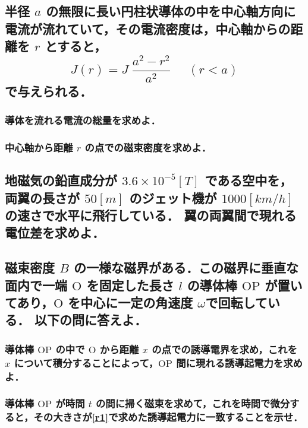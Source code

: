 \documentclass[a4paper, 12pt]{bxjsarticle}
\begin{document}
\newpage
\begin{samepage}
\subsection{半径 \(a\) の無限に長い円柱状導体の中を中心軸方向に電流が流れていて，その電流密度は，中心軸からの距離を \(r\) とすると，\[
    J(r) = J\;\frac{a^2-r^2}{a^2}\;\;\;\;\;(r < a)\]で与えられる．}
\subsubsection{導体を流れる電流の総量を求めよ．}
\vspace{10em}
\subsubsection{中心軸から距離 \(r\) の点での磁束密度を求めよ．}
\vspace{10em}
\subsection{地磁気の鉛直成分が \(3.6\times10^{-5}\si{[T]}\) である空中を，両翼の長さが \(50\si{[m]}\) のジェット機が \(1000\si{[km/h]}\) の速さで水平に飛行している．%
翼の両翼間で現れる電位差を求めよ．}
\end{samepage}
\newpage
\subsection{磁束密度 \(B\) の一様な磁界がある．この磁界に垂直な面内で一端 \(\mathrm{O}\) を固定した長さ \(l\) の導体棒 \(\mathrm{OP}\) が置いてあり，\(\mathrm{O}\) を中心に一定の角速度 \(\omega\)で回転している．%
以下の問に答えよ．}
\subsubsection{\label{r1}導体棒 \(\mathrm{OP}\) の中で \(\mathrm{O}\) から距離 \(x\) の点での誘導電界を求め，これを \(x\) について積分することによって，\(\mathrm{OP}\) 間に現れる誘導起電力を求めよ．}
\vspace{10em}
\subsubsection{導体棒 \(\mathrm{OP}\) が時間 \(t\) の間に掃く磁束を求めて，これを時間で微分すると，その大きさが\ref{r1}で求めた誘導起電力に一致することを示せ．}
\vspace{10em}
\end{document}
